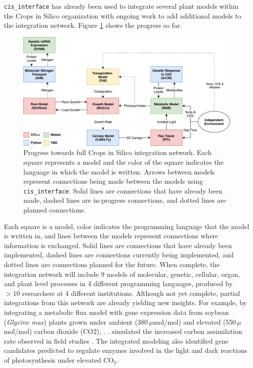 \documentclass[journal]{IEEEtran}
\newcommand{\cis}{{\tt cis\_interface}{}}
\begin{document}
{\cis} has already been used to integrate several plant models within the Crops in Silico organization with ongoing work to add additional models to the integration network. Figure \ref{fig:network} shows the progress so far. 
%
\ifinclfig
 	\begin{figure}[htbp]
	\begin{center}
	\includegraphics[width=\columnwidth,keepaspectratio]{./images/CiS-Languages.png}
	\caption{Progress towards full Crops in Silico integration network. Each square represents a model and the color of the square indicates the language in which the model is written. Arrows between models represent connections being made between the models using {\cis}. Solid lines are connections that have already been made, dashed lines are in-progress connections, and dotted lines are planned connections.}
	\label{fig:network}
	\end{center}
	\end{figure}
\fi
%
Each square is a model, color indicates the programming language that the model is written in, and lines between the models represent connections where information is exchanged. Solid lines are connections that have already been implemented, dashed lines are connections currently being implemented, and dotted lines are connections planned for the future. When complete, the integration network will include 9 models of molecular, genetic, cellular, organ, and plant level processes in 4 different programming languages, produced by $>10$ researchers at 4 different institutions. Although not yet complete, partial integrations from this network are already yielding new insights. For example, by integrating a metabolic flux model  with gene expression data from soybean (\emph{Glycine max}) plants grown under ambient (380\,$\mu$mol/mol) and elevated (550\,$\mu$mol/mol) carbon dioxide (CO2), 
%
\ifieee
	\citep{integration_prep}. 
\else
	\citet{integration_prep}. 
\fi
%
simulated the increased carbon assimilation rate observed in field studies \citep{Bernacchi2005}. The integrated modeling also identified gene candidates predicted to regulate enzymes involved in the light and dark reactions of photosynthesis under elevated CO$_2$.
\end{document}

